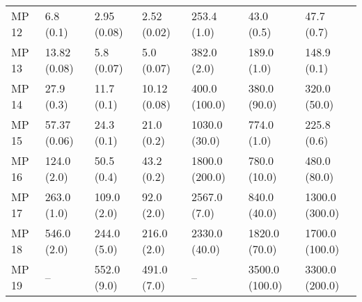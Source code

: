 \begin{tabular}{lllllll}
MP 12 &         6.8 (0.1) &           2.95 (0.08) &        2.52 (0.02) &             253.4 (1.0) &                  43.0 (0.5) &               47.7 (0.7) \\
MP 13 &      13.82 (0.08) &            5.8 (0.07) &         5.0 (0.07) &             382.0 (2.0) &                 189.0 (1.0) &              148.9 (0.1) \\
MP 14 &        27.9 (0.3) &            11.7 (0.1) &       10.12 (0.08) &           400.0 (100.0) &                380.0 (90.0) &             320.0 (50.0) \\
MP 15 &      57.37 (0.06) &            24.3 (0.1) &         21.0 (0.2) &           1030.0 (30.0) &                 774.0 (1.0) &              225.8 (0.6) \\
MP 16 &       124.0 (2.0) &            50.5 (0.4) &         43.2 (0.2) &          1800.0 (200.0) &                780.0 (10.0) &             480.0 (80.0) \\
MP 17 &       263.0 (1.0) &           109.0 (2.0) &         92.0 (2.0) &            2567.0 (7.0) &                840.0 (40.0) &           1300.0 (300.0) \\
MP 18 &       546.0 (2.0) &           244.0 (5.0) &        216.0 (2.0) &           2330.0 (40.0) &               1820.0 (70.0) &           1700.0 (100.0) \\
MP 19 &                -- &           552.0 (9.0) &        491.0 (7.0) &                      -- &              3500.0 (100.0) &           3300.0 (200.0) \\
\bottomrule
\end{tabular}
